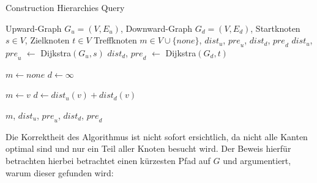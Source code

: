 \begin{algorithm}[ht]
    \caption{Construction Hierarchies Query}
    \begin{algorithmic}[1]
        \Require Upward-Graph $G_u = (V, E_u)$, Downward-Graph $G_d = (V, E_d)$, Startknoten $s \in V$, Zielknoten $t \in V$
        \Ensure Treffknoten $m \in V \cup \{ {none} \}$, ${dist}_u$, ${pre}_u$, ${dist}_d$, ${pre}_d$
        \State ${dist}_u$, ${pre}_u$ $\leftarrow$ Dijkstra$(G_u, s)$
        \State ${dist}_d$, ${pre}_d$ $\leftarrow$ Dijkstra$(G_d, t)$

        \State
        \State $m \leftarrow {none}$
        \State $d \leftarrow \infty$
        \State

        \State $m \leftarrow v$
        \State $d \leftarrow {dist}_u(v) + {dist}_d(v)$
        \EndIf
        \EndFor

        \State
        \State \Return $m$, ${dist}_u$, ${pre}_u$, ${dist}_d$, ${pre}_d$
    \end{algorithmic}
    \label{ch:query_simple}
\end{algorithm}

Die Korrektheit des Algorithmus ist nicht sofort ersichtlich, da nicht alle Kanten optimal sind und nur ein Teil aller Knoten besucht wird.
Der Beweis hierfür betrachten hierbei betrachtet einen kürzesten Pfad auf $G$ und argumentiert, warum dieser gefunden wird:

